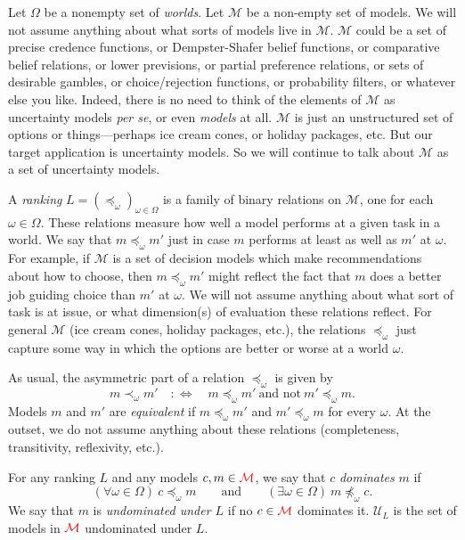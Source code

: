 \documentclass[11pt]{article}
\newcommand{\chg}[1]{{\color{red}#1}}
\theoremstyle{definition}
\theoremstyle{remark}
\newcommand{\M}{\mathcal M}
\newcommand{\U}{\mathcal U}
\begin{document}
Let $\Omega$ be a nonempty set of \emph{worlds}. Let $\M$ be a non-empty set of models. We will not assume anything about what sorts of models live in $\M$. $\M$ could be a set of precise credence functions, or Dempster-Shafer belief functions, or comparative belief relations, or lower previsions, or partial preference relations, or sets of desirable gambles, or choice/rejection functions, or probability filters, or whatever else you like. Indeed, there is no need to think of the elements of $\M$ as uncertainty models \textit{per se}, or even \textit{models} at all. $\M$ is just an unstructured set of options or things---perhaps ice cream cones, or holiday packages, etc. But our target application is uncertainty models. So we will continue to talk about $\M$ as a set of uncertainty models.




\chg{A \emph{ranking} $L=(\preceq_\omega)_{\omega\in\Omega}$ is a family of binary relations on $\M$, one for each $\omega\in\Omega$.} These relations measure how well a model performs at a given task in a world. We say that $m\preceq_\omega m'$ just in case $m$ performs at least as well as $m'$ at $\omega$. For example, if $\M$ is a set of decision models which make recommendations about how to choose, then $m\preceq_\omega m'$ might reflect the fact that $m$ does a better job guiding choice than $m'$ at $\omega$. We will not assume anything about what sort of task is at issue, or what dimension(s) of evaluation these relations reflect. For general $\M$ (ice cream cones, holiday packages, etc.), the relations $\preceq_\omega$ just capture some way in which the options are better or worse at a world $\omega$.

As usual, the asymmetric part of a relation $\preceq_\omega$ is given by
\[
m\prec_\omega m'\quad:\Longleftrightarrow\quad m\preceq_\omega m'\ \text{and not}\ m'\preceq_\omega m .
\]
Models $m$ and $m'$ are \emph{equivalent} if $m\preceq_\omega m'$ and $m'\preceq_\omega m$ for every $\omega$. At the outset, we do not assume anything about these relations (completeness, transitivity, reflexivity, etc.).

For any ranking $L$ and any models $c,m\in\chg{\M}$, we say that $c$ \emph{dominates} $m$ if
\[
(\forall\omega\in\Omega)\ c\preceq_\omega m\qquad\text{and}\qquad(\exists\omega\in\Omega)\ m\not\preceq_\omega c .
\]
We say that $m$ is \emph{undominated under $L$} if no $c\in\chg{\M}$ dominates it. $\U_L$ is the set of models in $\chg{\M}$ undominated under $L$.
\end{document}
